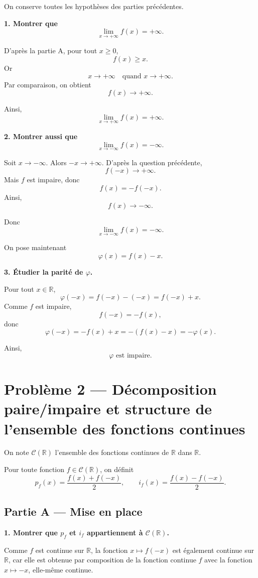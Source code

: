 \documentclass[11pt,a4paper]{article}
\newcommand{\R}{\mathbb{R}}
\begin{document}
On conserve toutes les hypothèses des parties précédentes.

\textbf{1. Montrer que}
\[
\lim_{x\to +\infty} f(x)=+\infty.
\]

D'après la partie A, pour tout \(x\ge 0\),
\[
f(x)\ge x.
\]
Or
\[
x\longrightarrow +\infty \quad \text{quand } x\to +\infty.
\]
Par comparaison, on obtient
\[
f(x)\longrightarrow +\infty.
\]

Ainsi,
\[
\boxed{\lim_{x\to +\infty} f(x)=+\infty.}
\]

\bigskip

\textbf{2. Montrer aussi que}
\[
\lim_{x\to -\infty} f(x)=-\infty.
\]

Soit \(x\to -\infty\). Alors \(-x\to +\infty\). D'après la question précédente,
\[
f(-x)\to +\infty.
\]
Mais \(f\) est impaire, donc
\[
f(x)=-f(-x).
\]
Ainsi,
\[
f(x)\to -\infty.
\]

Donc
\[
\boxed{\lim_{x\to -\infty} f(x)=-\infty.}
\]

\bigskip

On pose maintenant
\[
\varphi(x)=f(x)-x.
\]

\textbf{3. Étudier la parité de \(\varphi\).}

Pour tout \(x\in\R\),
\[
\varphi(-x)=f(-x)-(-x)=f(-x)+x.
\]
Comme \(f\) est impaire,
\[
f(-x)=-f(x),
\]
donc
\[
\varphi(-x)=-f(x)+x=-(f(x)-x)=-\varphi(x).
\]

Ainsi,
\[
\boxed{\varphi \text{ est impaire.}}
\]

\bigskip

\section*{Problème 2 --- Décomposition paire/impaire et structure de l'ensemble des fonctions continues}

On note \(\mathcal C(\R)\) l'ensemble des fonctions continues de \(\R\) dans \(\R\).

Pour toute fonction \(f\in \mathcal C(\R)\), on définit
\[
p_f(x)=\frac{f(x)+f(-x)}{2},
\qquad
i_f(x)=\frac{f(x)-f(-x)}{2}.
\]

\subsection*{Partie A --- Mise en place}

\textbf{1. Montrer que \(p_f\) et \(i_f\) appartiennent à \(\mathcal C(\R)\).}

Comme \(f\) est continue sur \(\R\), la fonction \(x\mapsto f(-x)\) est également continue sur \(\R\), car elle est obtenue par composition de la fonction continue \(f\) avec la fonction \(x\mapsto -x\), elle-même continue.
\end{document}
